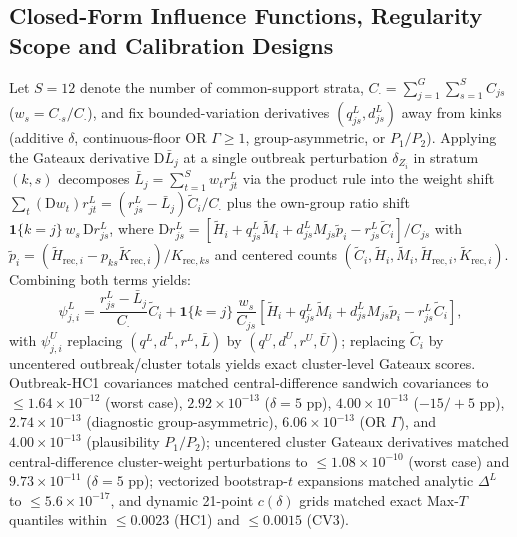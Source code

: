 \documentclass[11pt,a4paper]{article}
\begin{document}
\subsection*{Closed-Form Influence Functions, Regularity Scope and Calibration Designs}
Let $S = 12$ denote the number of common-support strata, $C_{\cdot} = \sum_{j=1}^{G}\sum_{s=1}^{S} C_{js}$ ($w_s = C_{\cdot s}/C_{\cdot}$), and fix bounded-variation derivatives $(q^L_{js}, d^L_{js})$ away from kinks (additive $\delta$, continuous-floor OR $\Gamma \ge 1$, group-asymmetric, or $P_1/P_2$). Applying the Gateaux derivative $\mathrm{D}\bar{L}_j$ at a single outbreak perturbation $\delta_{Z_i}$ in stratum $(k, s)$ decomposes $\bar{L}_j = \sum_{t=1}^{S} w_t r^L_{jt}$ via the product rule into the weight shift $\sum_t (\mathrm{D}w_t) r^L_{jt} = (r^L_{js} - \bar{L}_j)\tilde{C}_i/C_{\cdot}$ plus the own-group ratio shift $\mathbf{1}\{k=j\}\, w_s\,\mathrm{D}r^L_{js}$, where $\mathrm{D}r^L_{js} = [\tilde{H}_i + q^L_{js}\tilde{M}_i + d^L_{js}M_{js}\tilde{p}_i - r^L_{js}\tilde{C}_i]/C_{js}$ with $\tilde{p}_i = (\tilde{H}_{\text{rec},i} - p_{ks}\tilde{K}_{\text{rec},i})/K_{\text{rec},ks}$ and centered counts $(\tilde{C}_i, \tilde{H}_i, \tilde{M}_i, \tilde{H}_{\text{rec},i}, \tilde{K}_{\text{rec},i})$. Combining both terms yields:
\begin{equation}
  \psi^L_{j,i} = \frac{r^L_{js} - \bar{L}_j}{C_{\cdot}}\tilde{C}_i
  + \mathbf{1}\{k = j\}\, \frac{w_s}{C_{js}} \left[\tilde{H}_i + q^L_{js}\tilde{M}_i + d^L_{js}M_{js}\tilde{p}_i - r^L_{js}\tilde{C}_i\right],
  \label{eq:s-if}
\end{equation}
with $\psi^U_{j,i}$ replacing $(q^L, d^L, r^L, \bar{L})$ by $(q^U, d^U, r^U, \bar{U})$; replacing $\tilde{C}_i$ by uncentered outbreak/cluster totals yields exact cluster-level Gateaux scores. Outbreak-HC1 covariances matched central-difference sandwich covariances to $\le 1.64 \times 10^{-12}$ (worst case), $2.92 \times 10^{-13}$ ($\delta = 5\text{ pp}$), $4.00 \times 10^{-13}$ ($-15/+5\text{ pp}$), $2.74 \times 10^{-13}$ (diagnostic group-asymmetric), $6.06 \times 10^{-13}$ (OR $\Gamma$), and $4.00 \times 10^{-13}$ (plausibility $P_1/P_2$); uncentered cluster Gateaux derivatives matched central-difference cluster-weight perturbations to $\le 1.08 \times 10^{-10}$ (worst case) and $9.73 \times 10^{-11}$ ($\delta = 5\text{ pp}$); vectorized bootstrap-$t$ expansions matched analytic $\Delta^L$ to $\le 5.6 \times 10^{-17}$, and dynamic 21-point $c(\delta)$ grids matched exact Max-$T$ quantiles within $\le 0.0023$ (HC1) and $\le 0.0015$ (CV3).
\end{document}
